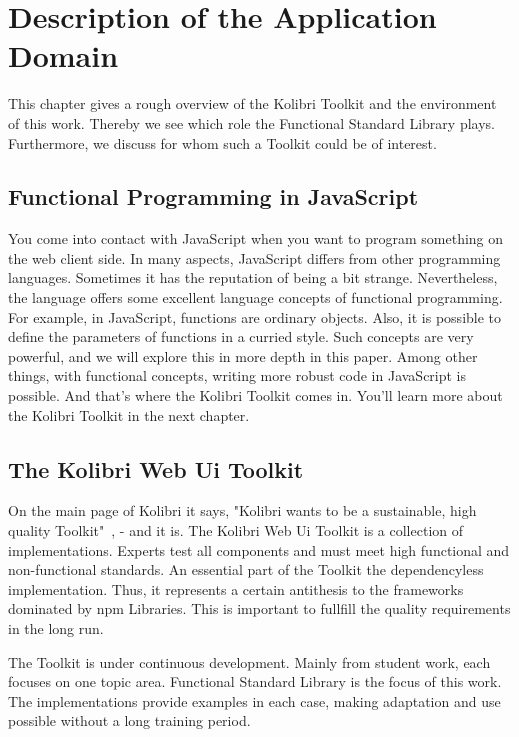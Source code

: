 \section{Description of the Application Domain}
\label{Description of the Application Domain}
This chapter gives a rough overview of the Kolibri Toolkit and the environment
of this work. Thereby we see which role the Functional Standard Library plays.
Furthermore, we discuss for whom such a Toolkit could be of interest.

\subsection{Functional Programming in JavaScript}
\label{sub:Functional Programming in JavaScript}
You come into contact with JavaScript when you want to program something on the
web client side. In many aspects, JavaScript differs from other programming
languages. Sometimes it has the reputation of being a bit strange.
Nevertheless, the language offers some excellent language concepts of
functional programming. For example, in JavaScript, functions are ordinary
objects. Also, it is possible to define the parameters of functions in a
curried style. Such concepts are very powerful, and we will explore this in
more depth in this paper. Among other things, with functional concepts, writing
more robust code in JavaScript is possible. And that's where the Kolibri
Toolkit comes in. You'll learn more about the Kolibri Toolkit in the next chapter.

\subsection{The Kolibri Web Ui Toolkit}
\label{The Kolibri Web Ui Toolkit}
On the main page of Kolibri it says, "Kolibri wants to be a sustainable, high
quality Toolkit"~\cite{kolibri}, - and it is.
The Kolibri Web Ui Toolkit is a collection of implementations. Experts test all
components and must meet high functional and non-functional standards. An
essential part of the Toolkit the dependencyless implementation. Thus, it
represents a certain antithesis to the frameworks dominated by npm Libraries.
This is important to fullfill the quality requirements in the long run.

The Toolkit is under continuous development. Mainly from student work, each
focuses on one topic area. Functional Standard Library is the focus of this
work. The implementations provide examples in each case, making adaptation and
use possible without a long training period.

